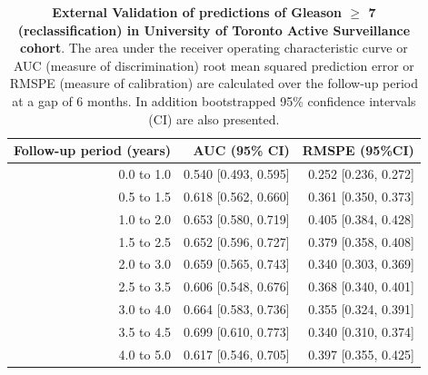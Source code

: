 \begin{table}[!htb]
\small\sf\centering
\caption{\textbf{External Validation of predictions of Gleason $\geq$ 7 (reclassification) in University of Toronto Active Surveillance cohort}. The area under the receiver operating characteristic curve or AUC (measure of discrimination) root mean squared prediction error or RMSPE (measure of calibration) are calculated over the follow-up period at a gap of 6 months. In addition bootstrapped 95\% confidence intervals (CI) are also presented.}
\label{tab:AUC_PE_Toronto}
\begin{tabular}{r|r|r}
\hline
\hline
Follow-up period (years) & AUC (95\% CI) & RMSPE (95\%CI)\\ 
\hline
0.0 to 1.0 & 0.540 [0.493, 0.595] & 0.252 [0.236, 0.272]\\
0.5 to 1.5 & 0.618 [0.562, 0.660] & 0.361 [0.350, 0.373]\\
1.0 to 2.0 & 0.653 [0.580, 0.719] & 0.405 [0.384, 0.428]\\
1.5 to 2.5 & 0.652 [0.596, 0.727] & 0.379 [0.358, 0.408]\\
2.0 to 3.0 & 0.659 [0.565, 0.743] & 0.340 [0.303, 0.369]\\
2.5 to 3.5 & 0.606 [0.548, 0.676] & 0.368 [0.340, 0.401]\\
3.0 to 4.0 & 0.664 [0.583, 0.736] & 0.355 [0.324, 0.391]\\
3.5 to 4.5 & 0.699 [0.610, 0.773] & 0.340 [0.310, 0.374]\\
4.0 to 5.0 & 0.617 [0.546, 0.705] & 0.397 [0.355, 0.425]\\
\hline
\end{tabular}	
\end{table}

